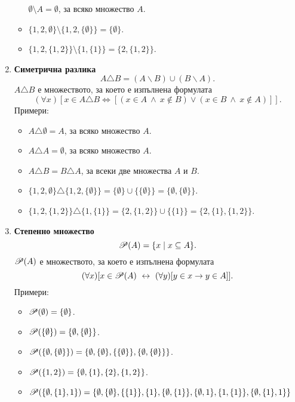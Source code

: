 \begin{enumerate}[{\bf (I)}]
\begin{itemize}
      $\emptyset \setminus A = \emptyset$, за всяко множество $A$.
    \item
      $\{1,2,\emptyset\} \setminus \{1,2,\{\emptyset\}\} = \{\emptyset\}$.
    \item
      $\{1,2,\{1,2\}\} \setminus \{1,\{1\}\} = \{2,\{1,2\}\}$.
    \end{itemize}
  \item
    {\bf Симетрична разлика}
    \[A\triangle B = (A\backslash B)\cup (B\backslash A).\]
    $A\triangle B$ е множеството, за което е изпълнена формулата
    \[(\forall x)[x \in A\triangle B \iff [(x\in A\ \wedge\ x \not\in B) \vee (x \in B\ \wedge\ x\not\in A)]].\]
    Примери:
    \begin{itemize}
    \item 
      $A \triangle \emptyset = A$, за всяко множество $A$.
    \item
      $A \triangle A = \emptyset$, за всяко множество $A$.
    \item
      $A\triangle B = B \triangle A$, за всеки две множества $A$ и $B$.
    \item
      $\{1,2,\emptyset\} \triangle \{1,2,\{\emptyset\}\} = \{\emptyset\} \cup \{\{\emptyset\}\} = \{\emptyset,\{\emptyset\}\}$.
    \item
      $\{1,2,\{1,2\}\} \triangle \{1,\{1\}\} = \{2,\{1,2\}\} \cup \{\{1\}\} = \{2,\{1\},\{1,2\}\}$.
    \end{itemize}
  \item
    {\bf Степенно множество}
    \[\mathscr{P}(A) = \{x\mid x\subseteq A\}.\]
    $\mathscr{P}(A)$ е множеството, за което е изпълнена формулата
    \[(\forall x)[x \in \mathscr{P}(A) \ \leftrightarrow\  (\forall y)[y\in x\rightarrow y \in A]].\]
    Примери:
    \begin{itemize}
    \item 
      $\mathscr{P}(\emptyset) = \{\emptyset\}$.
    \item
      $\mathscr{P}(\{\emptyset\}) = \{\emptyset,\{\emptyset\}\}$.
    \item
      $\mathscr{P}(\{\emptyset,\{\emptyset\}\}) = \{\emptyset,\{\emptyset\},\{\{\emptyset\}\},\{\emptyset,\{\emptyset\}\}\}$.
    \item
      $\mathscr{P}(\{1,2\}) = \{\emptyset,\{1\},\{2\},\{1,2\}\}$.
    \item
      $\mathscr{P}(\{\emptyset,\{1\},1\}) = \{\emptyset,\{\emptyset\}, \{\{1\}\},\{1\},\{\emptyset,\{1\}\},\{\emptyset,1\},\{1,\{1\}\},\{\emptyset,\{1\},1\}\}$
    \end{itemize}
  \end{enumerate}
